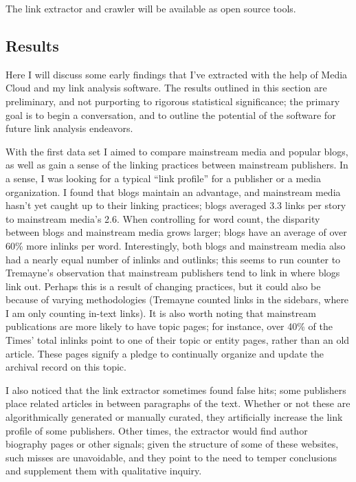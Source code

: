 The link extractor and crawler will be available as open source tools.

\subsection{Results}

Here I will discuss some early findings that I've extracted with the help of Media Cloud and my link analysis software. The results outlined in this section are preliminary, and not purporting to rigorous statistical significance; the primary goal is to begin a conversation, and to outline the potential of the software for future link analysis endeavors.

With the first data set I aimed to compare mainstream media and popular blogs, as well as gain a sense of the linking practices between mainstream publishers. In a sense, I was looking for a typical ``link profile'' for a publisher or a media organization. I found that blogs maintain an advantage, and mainstream media hasn't yet caught up to their linking practices; blogs averaged 3.3 links per story to mainstream media's 2.6. When controlling for word count, the disparity between blogs and mainstream media grows larger; blogs have an average of over 60\% more inlinks per word. Interestingly, both blogs and mainstream media also had a nearly equal number of inlinks and outlinks; this seems to run counter to Tremayne's observation that mainstream publishers tend to link in where blogs link out. Perhaps this is a result of changing practices, but it could also be because of varying methodologies (Tremayne counted links in the sidebars, where I am only counting in-text links). It is also worth noting that mainstream publications are more likely to have topic pages; for instance, over 40\% of the Times' total inlinks point to one of their topic or entity pages, rather than an old article. These pages signify a pledge to continually organize and update the archival record on this topic.

I also noticed that the link extractor sometimes found false hits; some publishers place related articles in between paragraphs of the text. Whether or not these are algorithmically generated or manually curated, they artificially increase the link profile of some publishers. Other times, the extractor would find author biography pages or other signals; given the structure of some of these websites, such misses are unavoidable, and they point to the need to temper conclusions and supplement them with qualitative inquiry.

